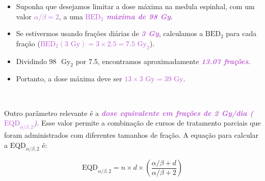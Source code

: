 \documentclass[11pt,a4paper]{article}
\begin{document}
	\begin{tcolorbox}[width=\textwidth, colback={white}, colbacktitle={DarkTurquoise!50!white}, title={$\bigstar$ \LobsterTwo{Exemplo: Cálculo do BED} $\bigstar $}, coltitle={CarnationPink}, colframe={DarkTurquoise}, fonttitle=\rmfamily\bfseries\Large, breakable]

		\begin{itemize}[label=\textcolor{CarnationPink}{$\blacktriangleright$}]
			\item Suponha que desejamos limitar a dose máxima na medula espinhal, com um valor \textcolor{MediumOrchid}{\textbf{\textit{$\alpha/\beta = 2$}}}, a uma \textcolor{MediumOrchid}{\textbf{\textit{$\text{BED}_2$ máxima de 98 Gy}}}. 
			\item Se estivermos usando frações diárias de \textcolor{MediumOrchid}{\textbf{\textit{3 Gy}}}, calculamos a $\text{BED}_2$ para cada fração (\textcolor{MediumOrchid}{\textbf{\textit{$\text{BED}_2(3 \text{ Gy}) = 3 \times 2.5 = 7.5 \text{ Gy}_2$}}}). 
			\item Dividindo 98 $\text{ Gy}_2$ por 7.5, encontramos aproximadamente \textcolor{MediumOrchid}{\textbf{\textit{13.07 frações}}}.
			\item Portanto, a dose máxima deve ser \textcolor{MediumOrchid}{\textbf{\textit{$13 \times 3 \text{ Gy} = 39 \text{ Gy}$}}}.
		\end{itemize}
	\end{tcolorbox}
	
	\
	
	Outro parâmetro relevante é a \textcolor{MediumOrchid}{\textbf{\textit{dose equivalente em frações de 2 Gy/dia ($\text{EQD}_{\alpha/\beta, 2}$)}}}. Esse valor permite a combinação de cursos de tratamento parciais que foram administrados com diferentes tamanhos de fração. A equação para calcular a $\text{EQD}_{\alpha/\beta, 2}$ é:

	\begin{equation}
		\text{EQD}_{\alpha/\beta, 2} = n \times d \times \left(\frac{\alpha/\beta + d}{\alpha/\beta + 2}\right)
	\end{equation}
\end{document}
